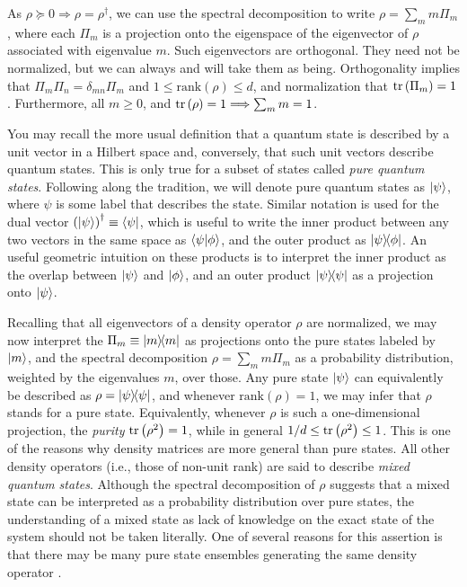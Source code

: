 		As $\rho \succeq 0 \Longrightarrow \rho = \rho^\dagger$, we can use the spectral decomposition to write $\rho = \sum_m m \Pi_m$, where each $\Pi_m$ is a projection onto the eigenspace of the eigenvector of $\rho$ associated with eigenvalue $m$. Such eigenvectors are orthogonal. They need not be normalized, but we can always and will take them as being. Orthogonality implies that $\Pi_m \Pi_n = \delta_{mn} \Pi_m$ and $1 \leq \text{rank}(\rho) \leq d$, and normalization that $\text{tr}\left( \Pi_m \right) = 1$.  Furthermore, all $m \geq 0$, and $\text{tr}\left( \rho \right) = 1 \Longrightarrow \sum_m m = 1$. 
	
		You may recall the more usual definition that a quantum state is described by a unit vector in a Hilbert space and, conversely, that such unit vectors describe quantum states. This is only true for a subset of states called \emph{pure quantum states}. Following along the tradition, we will denote pure quantum states as $\ket{\psi}$, where $\psi$ is some label that describes the state. Similar notation is used for the dual vector $\left( \ket{\psi} \right)^\dagger \equiv \bra{\psi}$, which is useful to write the inner product between any two vectors in the same space as $\braket{\psi}{\phi}$, and the outer product as $\ketbra{\psi}{\phi}$. An useful geometric intuition on these products is to interpret the inner product as the overlap between $\ket{\psi}$ and $\ket{\phi}$, and an outer product $\ketbra{\psi}{\psi}$ as a projection onto $\ket{\psi}$.
	
		Recalling that all eigenvectors of a density operator $\rho$ are normalized, we may now interpret the $\Pi_m \equiv \ketbra{m}{m}$ as projections onto the pure states labeled by $\ket{m}$, and the spectral decomposition $\rho = \sum_m m \Pi_m$ as a probability distribution, weighted by the eigenvalues $m$, over those. Any pure state $\ket{\psi}$ can equivalently be described as $\rho = \ketbra{\psi}{\psi}$, and whenever $\text{rank}(\rho) = 1$, we may infer that $\rho$ stands for a pure state. Equivalently, whenever $\rho$ is such a one-dimensional projection, the \emph{purity} $\text{tr}\left( \rho^2 \right) = 1$, while in general $1/d \leq \text{tr}\left( \rho^2 \right) \leq 1$. This is one of the reasons why density matrices are more general than pure states. All other density operators (i.e., those of non-unit rank) are said to describe \emph{mixed quantum states}. Although the spectral decomposition of $\rho$ suggests that a mixed state can be interpreted as a probability distribution over pure states, the understanding of a mixed state as lack of knowledge on the exact state of the system should not be taken literally. One of several reasons for this assertion is that there may be many pure state ensembles generating the same density operator \cite{hughston_1993_densitymatrix}.
	

